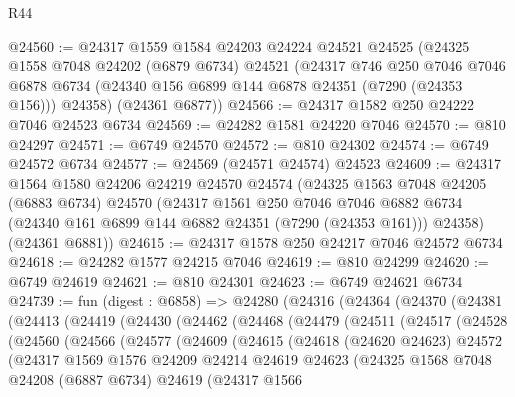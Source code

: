 \begin{lexlean}{R44}
\begin{coremodule}
{@24560 := @24317
    @1559
    @1584
    @24203
    @24224
    @24521
    @24525
    (@24325
      @1558
      @7048
      @24202
      (@6879 @6734)
      @24521
      (@24317
        @746
        @250
        @7046
        @7046
        @6878
        @6734
        (@24340 @156 @6899 @144 @6878 @24351 (@7290 (@24353 @156)))
        @24358)
      (@24361 @6877))
@24566 := @24317 @1582 @250 @24222 @7046 @24523 @6734
@24569 := @24282 @1581 @24220 @7046
@24570 := @810 @24297
@24571 := @6749 @24570
@24572 := @810 @24302
@24574 := @6749 @24572 @6734
@24577 := @24569 (@24571 @24574) @24523
@24609 := @24317
    @1564
    @1580
    @24206
    @24219
    @24570
    @24574
    (@24325
      @1563
      @7048
      @24205
      (@6883 @6734)
      @24570
      (@24317
        @1561
        @250
        @7046
        @7046
        @6882
        @6734
        (@24340 @161 @6899 @144 @6882 @24351 (@7290 (@24353 @161)))
        @24358)
      (@24361 @6881))
@24615 := @24317 @1578 @250 @24217 @7046 @24572 @6734
@24618 := @24282 @1577 @24215 @7046
@24619 := @810 @24299
@24620 := @6749 @24619
@24621 := @810 @24301
@24623 := @6749 @24621 @6734
@24739 := fun (digest : @6858) =>
  @24280
    (@24316
      (@24364
        (@24370
          (@24381
            (@24413
              (@24419
                (@24430
                  (@24462
                    (@24468
                      (@24479
                        (@24511
                          (@24517
                            (@24528
                              (@24560
                                (@24566
                                  (@24577
                                    (@24609
                                      (@24615
                                        (@24618
                                          (@24620 @24623)
                                          @24572
                                          (@24317
                                            @1569
                                            @1576
                                            @24209
                                            @24214
                                            @24619
                                            @24623
                                            (@24325
                                              @1568
                                              @7048
                                              @24208
                                              (@6887 @6734)
                                              @24619
                                              (@24317
                                                @1566
}
\end{coremodule}
\end{lexlean}
